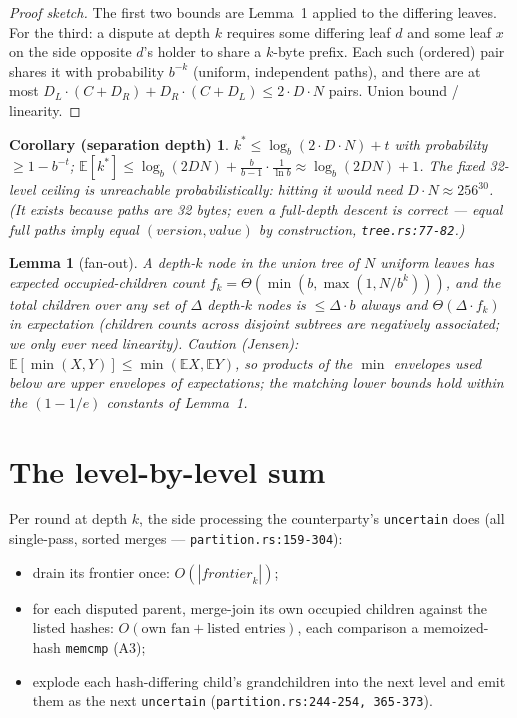 \documentclass[11pt]{article}
\newcommand{\code}[1]{\texttt{#1}}
\theoremstyle{plain}
\newtheorem{lemma}{Lemma}
\newtheorem*{corollary}{Corollary (separation depth)}
\begin{document}
\begin{proof}[Proof sketch]
The first two bounds are Lemma~1 applied to the differing leaves. For the
third: a dispute at depth $k$ requires some differing leaf $d$ and some
leaf $x$ on the side opposite $d$'s holder to share a $k$-byte prefix. Each
such (ordered) pair shares it with probability $b^{-k}$ (uniform,
independent paths), and there are at most
$D_L \cdot (C + D_R) + D_R \cdot (C + D_L) \le 2 \cdot D \cdot N$ pairs.
Union bound / linearity.
\end{proof}

\begin{corollary}
$k^* \le \log_b(2 \cdot D \cdot N) + t$ with probability $\ge 1 - b^{-t}$;
$\mathbb{E}[k^*] \le \log_b(2DN) + \frac{b}{b-1} \cdot \frac{1}{\ln b}
\approx \log_b(2DN) + 1$. The fixed 32-level ceiling is unreachable
probabilistically: hitting it would need $D \cdot N \approx 256^{30}$. (It
exists because paths are 32 bytes; even a full-depth descent is
\emph{correct} --- equal full paths imply equal
$(\textit{version}, \textit{value})$ by construction, \code{tree.rs:77-82}.)
\end{corollary}

\begin{lemma}[fan-out]
A depth-$k$ node in the union tree of $N$ uniform leaves has expected
occupied-children count $f_k = \Theta(\min(b, \max(1, N/b^k)))$, and the
\emph{total} children over any set of $\Delta$ depth-$k$ nodes is
$\le \Delta \cdot b$ always and $\Theta(\Delta \cdot f_k)$ in expectation
(children counts across disjoint subtrees are negatively associated; we
only ever need linearity). \emph{Caution (Jensen):}
$\mathbb{E}[\min(X, Y)] \le \min(\mathbb{E}X, \mathbb{E}Y)$, so products of
the $\min$ envelopes used below are upper envelopes of expectations; the
matching lower bounds hold within the $(1 - 1/e)$ constants of Lemma~1.
\end{lemma}

\section{The level-by-level sum}

Per round at depth $k$, the side processing the counterparty's
\code{uncertain} does (all single-pass, sorted merges ---
\code{partition.rs:159-304}):

\begin{itemize}
\item drain its frontier once: $O(|\textit{frontier}_k|)$;
\item for each disputed parent, merge-join its own occupied children
  against the listed hashes: $O(\text{own fan} + \text{listed entries})$,
  each comparison a memoized-hash \code{memcmp} (A3);
\item explode each hash-differing child's grandchildren into the next
  level and emit them as the next \code{uncertain}
  (\code{partition.rs:244-254, 365-373}).
\end{itemize}
\end{document}
